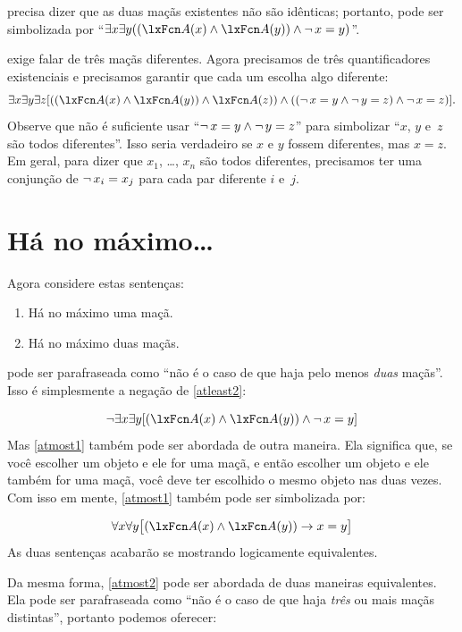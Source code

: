  precisa dizer que as duas maçãs existentes não são idênticas; portanto, pode ser simbolizada por \textquotedblleft $\exists x \exists y((\atom{A}{x} \eand \atom{A}{y}) \eand \enot\, {x = y})$\textquotedblright{}.



 exige falar de três maçãs diferentes. Agora precisamos de três quantificadores existenciais e precisamos garantir que cada um escolha algo diferente:
\[
	\exists x \exists y\exists z[((\atom{A}{x} \eand \atom{A}{y}) \eand \atom{A}{z}) \eand ((\enot\, {x = y} \eand \enot\, {y = z}) \eand \enot\, {x = z})].
\]
Observe que não é suficiente usar \textquotedblleft $\neg\, {x = y} \wedge \neg\, {y = z}$\textquotedblright{} para simbolizar \textquotedblleft $x$, $y$ e~$z$ são todos diferentes\textquotedblright{}. Isso seria verdadeiro se $x$ e $y$ fossem diferentes, mas $x = z$. Em geral, para dizer que $x_1$, \dots, $x_n$ são todos diferentes, precisamos ter uma conjunção de $\neg\, {x_i = x_j}$ para cada par diferente $i$ e~$j$.

\section{Há no máximo\ldots}
Agora considere estas sentenças:
\begin{enumerate}
\item\label{atmost1} Há no máximo uma maçã.
\item\label{atmost2} Há no máximo duas maçãs.
\end{enumerate}
 pode ser parafraseada como \textquotedblleft não é o caso de que haja pelo menos \emph{duas} maçãs\textquotedblright{}. Isso é simplesmente a negação de \cref{atleast2}:


\[
	\enot \exists x \exists y[(\atom{A}{x} \eand \atom{A}{y}) \eand \enot\, {x = y}]
\]
Mas \cref*{atmost1} também pode ser abordada de outra maneira. Ela significa que, se você escolher um objeto e ele for uma maçã, e então escolher um objeto e ele também for uma maçã, você deve ter escolhido o mesmo objeto nas duas vezes. Com isso em mente, \cref*{atmost1} também pode ser simbolizada por:




\[
	\forall x\forall y\bigl[(\atom{A}{x} \eand \atom{A}{y}) \eif x=y\bigr]
\]
As duas sentenças acabarão se mostrando logicamente equivalentes.

Da mesma forma, \cref*{atmost2} pode ser abordada de duas maneiras equivalentes.
Ela pode ser parafraseada como \textquotedblleft não é o caso de que haja \emph{três} ou mais maçãs distintas\textquotedblright{}, portanto podemos oferecer:

